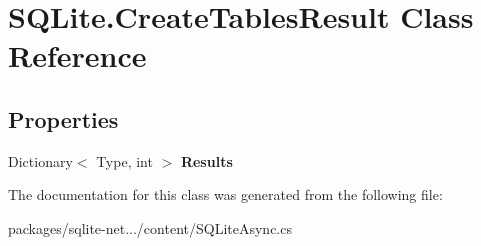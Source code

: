 \hypertarget{classSQLite_1_1CreateTablesResult}{}\section{S\+Q\+Lite.\+Create\+Tables\+Result Class Reference}
\label{classSQLite_1_1CreateTablesResult}
\subsection*{Properties}
\begin{DoxyCompactItemize}
\item 
\hypertarget{classSQLite_1_1CreateTablesResult_a570a918ea3d12d83f8dd1e2116c818c5}{}Dictionary$<$ Type, int $>$ {\bfseries Results}\label{classSQLite_1_1CreateTablesResult_a570a918ea3d12d83f8dd1e2116c818c5}

\end{DoxyCompactItemize}


The documentation for this class was generated from the following file\+:\begin{DoxyCompactItemize}
\item 
packages/sqlite-\/net.../content/S\+Q\+Lite\+Async.\+cs\end{DoxyCompactItemize}
